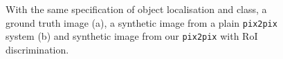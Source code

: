 \begin{figure}[h]%
    \centering
    \qquad
    \qquad
    \caption{With the same specification of object localisation and class, a ground truth image (a), a synthetic image from a plain \texttt{pix2pix} system (b) and synthetic image from our \texttt{pix2pix} with RoI discrimination.}%
    \label{fig:roi_mnist_comparison}%
\end{figure}

